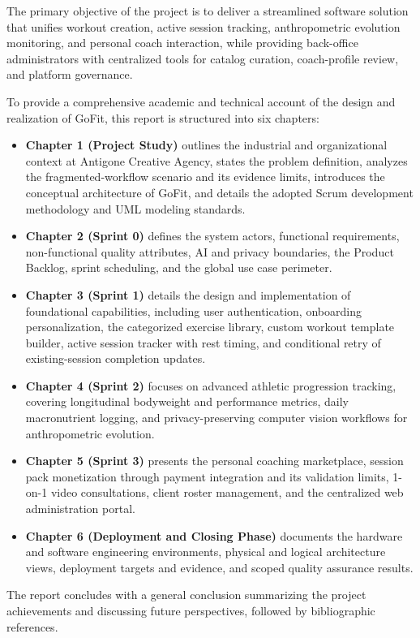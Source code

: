 \documentclass[12pt,a4paper,openany]{report}
\begin{document}
The primary objective of the project is to deliver a streamlined software solution that unifies workout creation, active session tracking, anthropometric evolution monitoring, and personal coach interaction, while providing back-office administrators with centralized tools for catalog curation, coach-profile review, and platform governance.

To provide a comprehensive academic and technical account of the design and realization of GoFit, this report is structured into six chapters:
\begin{itemize}
    \item \textbf{Chapter 1 (Project Study)} outlines the industrial and organizational context at Antigone Creative Agency, states the problem definition, analyzes the fragmented-workflow scenario and its evidence limits, introduces the conceptual architecture of GoFit, and details the adopted Scrum development methodology and UML modeling standards.
    \item \textbf{Chapter 2 (Sprint 0)} defines the system actors, functional requirements, non-functional quality attributes, AI and privacy boundaries, the Product Backlog, sprint scheduling, and the global use case perimeter.
    \item \textbf{Chapter 3 (Sprint 1)} details the design and implementation of foundational capabilities, including user authentication, onboarding personalization, the categorized exercise library, custom workout template builder, active session tracker with rest timing, and conditional retry of existing-session completion updates.
    \item \textbf{Chapter 4 (Sprint 2)} focuses on advanced athletic progression tracking, covering longitudinal bodyweight and performance metrics, daily macronutrient logging, and privacy-preserving computer vision workflows for anthropometric evolution.
    \item \textbf{Chapter 5 (Sprint 3)} presents the personal coaching marketplace, session pack monetization through payment integration and its validation limits, 1-on-1 video consultations, client roster management, and the centralized web administration portal.
    \item \textbf{Chapter 6 (Deployment and Closing Phase)} documents the hardware and software engineering environments, physical and logical architecture views, deployment targets and evidence, and scoped quality assurance results.
\end{itemize}
The report concludes with a general conclusion summarizing the project achievements and discussing future perspectives, followed by bibliographic references.
\end{document}
